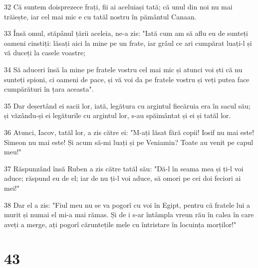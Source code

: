 \par 32 Că suntem doisprezece frați, fii ai aceluiași tată; că unul din noi nu mai trăiește, iar cel mai mic e cu tatăl nostru în pământul Canaan.
\par 33 Însă omul, stăpânul țării aceleia, ne-a zis: "Iată cum am să aflu eu de sunteți oameni cinstiți: lăsați aici la mine pe un frate, iar grâul ce ari cumpărat luați-l și vă duceți la casele voastre;
\par 34 Să aduceri însă la mine pe fratele vostru cel mai mic și atunci voi ști că nu sunteți spioni, ci oameni de pace, și vă voi da pe fratele vostru și veți putea face cumpărături în țara aceasta".
\par 35 Dar deșertând ei sacii lor, iată, legătura cu argintul fiecăruia era în sacul său; și văzându-și ei legăturile cu argintul lor, s-au spăimântat și ei și tatăl lor.
\par 36 Atunci, Iacov, tatăl lor, a zis către ei: "M-ați lăsat fără copii! Iosif nu mai este! Simeon nu mai este! Și acum să-mi luați și pe Veniamin? Toate au venit pe capul meu!"
\par 37 Răspunzând însă Ruben a zis către tatăl său: "Dă-l în seama mea și ți-l voi aduce; răspund eu de el; iar de nu ți-l voi aduce, să omori pe cei doi feciori ai mei!"
\par 38 Dar el a zis: "Fiul meu nu se va pogorî cu voi în Egipt, pentru că fratele lui a murit și numai el mi-a mai rămas. Și de i s-ar întâmpla vreun rău în calea în care aveți a merge, ați pogorî căruntețile mele cu întristare în locuința morților!"

\chapter{43}

